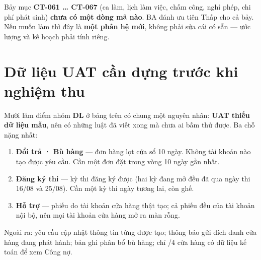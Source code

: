 Bảy mục \textbf{CT-061 … CT-067} (ca làm, lịch làm việc, chấm công, nghỉ phép, chi phí phát
sinh) \textbf{chưa có một dòng mã nào}. BA đánh ưu tiên Thấp cho cả bảy. Nếu muốn làm thì đây
là \textbf{một phân hệ mới}, không phải sửa cái có sẵn --- ước lượng và kế hoạch phải tính
riêng.

\section{Dữ liệu UAT cần dựng trước khi nghiệm thu}

Mười lăm điểm nhóm \textbf{DL} ở bảng trên có chung một nguyên nhân: \textbf{UAT thiếu dữ liệu
mẫu}, nên có những luật đã viết xong mà chưa ai bấm thử được. Ba chỗ nặng nhất:

\begin{enumerate}[leftmargin=*]
  \item \textbf{Đổi trả · Bù hàng} ---  đơn hàng lọt cửa sổ 10 ngày. Không tài khoản nào
        tạo được yêu cầu. Cần một đơn đặt trong vòng 10 ngày gần nhất.
  \item \textbf{Đăng ký thi} ---  kỳ thi đăng ký được (hai kỳ đang mở đều đã qua ngày
        thi 16/08 và 25/08). Cần một kỳ thi ngày tương lai, còn ghế.
  \item \textbf{Hỗ trợ} ---  phiếu do tài khoản cửa hàng thật tạo; cả  phiếu đều
        của tài khoản nội bộ, nên mọi tài khoản cửa hàng mở ra màn rỗng.
\end{enumerate}

Ngoài ra:  yêu cầu cập nhật thông tin từng được tạo;  thông báo gửi đích danh cửa
hàng đang phát hành;  bản ghi phân bổ bù hàng; chỉ /4 cửa hàng có dữ liệu kế
toán để xem Công nợ.
